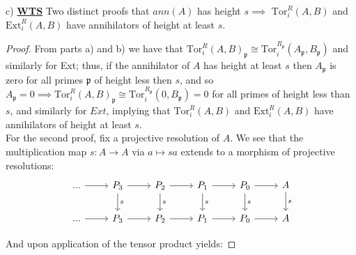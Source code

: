 \documentclass{article}
\newcommand{\fk}[1]{\mathfrak{#1}}
\newcommand{\iso}{\cong}
\begin{document}
\newpage
c) \textbf{\underline{WTS}} Two distinct proofs that $ann(A)$ has height $s \implies$ $\text{Tor}_{i}^{R}(A,B)$ and $\text{Ext}_{i}^{R}(A,B)$ have annihilators of height at least $s$.
\begin{proof}
  From parts a) and b) we have that $\text{Tor}_{i}^{R}(A,B)_{\fk{p}} \iso \text{Tor}_{i}^{R_{\fk{p}}}(A_{\fk{p}}, B_{\fk{p}})$ and similarly for Ext; thus, if the annihilator of $A$ has height at least $s$ then $A_{\fk{p}}$ is zero for all primes $\fk{p}$ of height less then $s$, and so $A_{\fk{p}} = 0 \implies \text{Tor}_{i}^{R}(A,B)_{\fk{p}} \iso \text{Tor}_{i}^{R_{\fk{p}}}(0, B_{\fk{p}}) = 0$ for all primes of height less than $s$, and similarly for $Ext$, implying that $\text{Tor}_{i}^{R}(A,B)$ and $\text{Ext}_{i}^{R}(A,B)$ have annihilators of height at least $s$.\\

  For the second proof, fix a projective resolution of $A$. We see that the multiplication map $s: A \to A$ via $a \mapsto sa$ extends to a morphism of projective resolutions:
  \[
    \begin{tikzcd}
... \arrow[r] & P_3 \arrow[r] \arrow[d, "s"] & P_2 \arrow[r] \arrow[d, "s"] & P_1 \arrow[r] \arrow[d, "s"] & P_0 \arrow[r] \arrow[d, "s"] & A \arrow[d, "s"] \\
... \arrow[r] & P_3 \arrow[r]                & P_2 \arrow[r]                & P_1 \arrow[r]                & P_0 \arrow[r]                & A               
\end{tikzcd}
\]

And upon application of the tensor product yields:


\end{proof}
\end{document}
